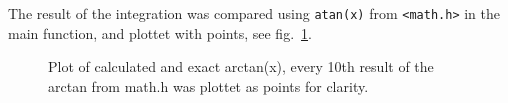 \documentclass[10pt]{article}
\begin{document}
	The result of the integration was compared using \texttt{atan(x)} from \texttt{<math.h>} in the main function, and plottet with points, see fig.~\ref{fig:arctan_plot}.

	\begin{figure}[hb]
	\centering
	
	\caption{Plot of calculated and exact arctan(x), every 10th result of the arctan from math.h was plottet as points for clarity.}
	\label{fig:arctan_plot}
	\end{figure}
\end{document}

